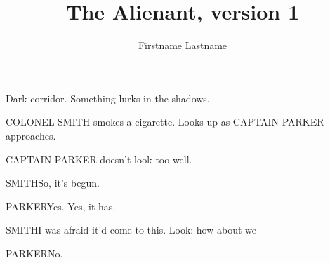 \documentclass{screenplay}
\title{The Alienant, version 1}
\author{Firstname Lastname}
\begin{document}
\coverpage
\fadein
{}

Dark corridor. Something lurks in the shadows.


COLONEL SMITH smokes a cigarette. Looks up as CAPTAIN PARKER approaches.

CAPTAIN PARKER doesn't look too well.

\begin{dialogue}{SMITH}So, it's begun.\end{dialogue}

\begin{dialogue}{PARKER}Yes.  Yes, it has.\end{dialogue}

\begin{dialogue}{SMITH}I was afraid it'd come to this. Look: how about we –\end{dialogue}

\begin{dialogue}{PARKER}No.\end{dialogue}

\fadeout
\theend
\end{document}
